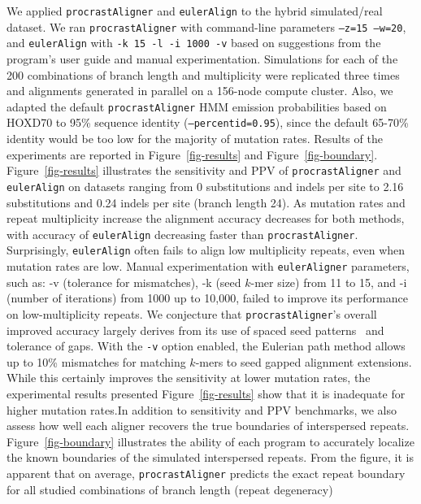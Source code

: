 \documentclass[9.5pt,journal,final,finalsubmission,twocolumn]{IEEEtran}
\begin{document}
We applied \texttt{procrastAligner} and \texttt{eulerAlign} to the
hybrid simulated/real dataset.  We ran \texttt{procrastAligner}
with command-line parameters \texttt{--z=15 --w=20}, and
\texttt{eulerAlign} with \texttt{-k 15 -l -i 1000 -v} based on suggestions
from the program's user guide and manual experimentation.
Simulations for each of the 200 combinations of branch length and
multiplicity were replicated three times and alignments generated in
parallel on a 156-node compute cluster.  Also, we adapted the default \texttt{procrastAligner} HMM emission probabilities based on HOXD70 to 95\% sequence identity (\texttt{--percentid=0.95}), since the default 65-70\% identity would be too low for the majority of mutation rates.  Results of the experiments
are reported in Figure~\ref{fig-results} and
Figure~\ref{fig-boundary}. Figure~\ref{fig-results} illustrates the
sensitivity and PPV of
\texttt{procrastAligner} and
\texttt{eulerAlign} on datasets ranging from 0 substitutions and
indels per site to 2.16 substitutions and 0.24 indels per site (branch length 24).  As
mutation rates and repeat multiplicity increase the alignment accuracy
decreases for both methods, with accuracy of \texttt{eulerAlign}
decreasing faster than \texttt{procrastAligner}.  Surprisingly, \texttt{eulerAlign}
often fails to align low multiplicity repeats, even when mutation rates are low.
Manual experimentation with \texttt{eulerAligner} parameters, such as: -v (tolerance for mismatches), -k (seed $k$-mer size) from 11 to 15, and -i (number of iterations) from 1000 up to 10,000, failed to improve its performance on low-multiplicity repeats.
We conjecture that \texttt{procrastAligner}'s overall improved accuracy largely derives
from its use of spaced seed patterns~\cite{ref-procrast} and tolerance
of gaps. With the \texttt{-v} option enabled, the Eulerian path method allows up to 10\% mismatches for matching $k$-mers to seed gapped alignment extensions. While this certainly improves the sensitivity at lower mutation rates, the experimental results presented Figure~\ref{fig-results} show that it is inadequate for higher mutation rates.In addition to sensitivity and PPV benchmarks, we also assess how well
each aligner recovers the true boundaries of interspersed
repeats.  Figure~\ref{fig-boundary} illustrates the ability of each
program to accurately localize the known boundaries of the simulated interspersed
repeats. From the figure, it is apparent that on average, \texttt{procrastAligner} predicts
the exact repeat boundary for all studied combinations of branch length (repeat degeneracy)
\end{document}
